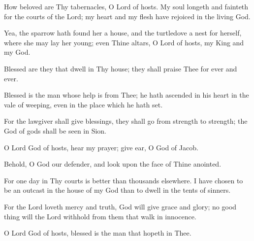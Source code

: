 How beloved are Thy tabernacles, O Lord of hosts. My soul longeth and fainteth for the courts of the Lord; my heart and my flesh have rejoiced in the living God.

Yea, the sparrow hath found her a house, and the turtledove a nest for herself, where she may lay her young; even Thine altars, O Lord of hosts, my King and my God.

Blessed are they that dwell in Thy house; they shall praise Thee for ever and ever.

Blessed is the man whose help is from Thee; he hath ascended in his heart in the vale of weeping, even in the place which he hath set.

For the lawgiver shall give blessings, they shall go from strength to strength; the God of gods shall be seen in Sion.

O Lord God of hosts, hear my prayer; give ear, O God of Jacob.

Behold, O God our defender, and look upon the face of Thine anointed.

For one day in Thy courts is better than thousands elsewhere. I have chosen to be an outcast in the house of my God than to dwell in the tents of sinners.

For the Lord loveth mercy and truth, God will give grace and glory; no good thing will the Lord withhold from them that walk in innocence.

O Lord God of hosts, blessed is the man that hopeth in Thee.
